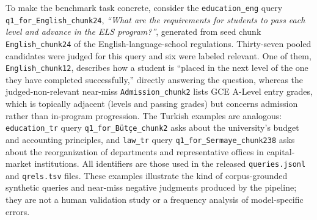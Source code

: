 To make the benchmark task concrete, consider the \texttt{education\_eng} query \texttt{q1\_for\_English\_chunk24}, \emph{``What are the requirements for students to pass each level and advance in the ELS program?''}, generated from seed chunk \texttt{English\_chunk24} of the English-language-school regulations. Thirty-seven pooled candidates were judged for this query and six were labeled relevant. One of them, \texttt{English\_chunk12}, describes how a student is ``placed in the next level of the one they have completed successfully,'' directly answering the question, whereas the judged-non-relevant near-miss \texttt{Admission\_chunk2} lists GCE A-Level entry grades, which is topically adjacent (levels and passing grades) but concerns admission rather than in-program progression. The Turkish examples are analogous: \texttt{education\_tr} query \texttt{q1\_for\_B\"ut\c{c}e\_chunk2} asks about the university's budget and accounting principles, and \texttt{law\_tr} query \texttt{q1\_for\_Sermaye\_chunk238} asks about the reorganization of departments and representative offices in capital-market institutions. All identifiers are those used in the released \texttt{queries.jsonl} and \texttt{qrels.tsv} files. These examples illustrate the kind of corpus-grounded synthetic queries and near-miss negative judgments produced by the pipeline; they are not a human validation study or a frequency analysis of model-specific errors.

